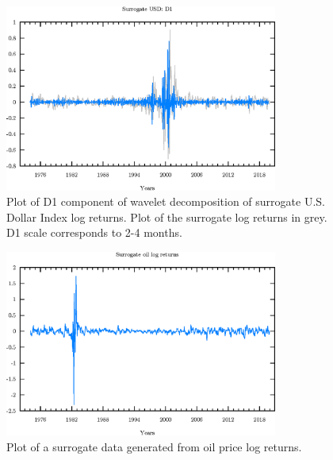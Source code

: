 \begin{figure}
\begin{center}
\includegraphics[width=0.8\textwidth]{./code/plot/surrogate_usd_wr_D1.eps}
\caption{Plot of D1 component of wavelet decomposition of surrogate U.S. Dollar Index log returns. 
	Plot of the surrogate log returns in grey. D1 scale corresponds to 2-4 months.}
\end{center}
\label{fig:s-usd-wr-d1}
\end{figure}

\begin{figure}
\begin{center}
\includegraphics[width=0.8\textwidth]{./code/plot/surrogate_oil_logret.eps}
\caption{Plot of a surrogate data generated from oil price log returns.}
\label{fig:s-oil-logret}
\end{center}
\end{figure}


